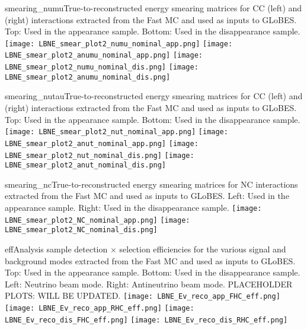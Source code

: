 \begin{cdrfigure}{smearing_numu}{True-to-reconstructed energy smearing matrices for CC \numu (left) and \anumu (right) interactions extracted from the Fast MC and used as inputs to GLoBES.  Top: Used in the appearance sample.  Bottom: Used in the disappearance sample.}
 \texttt{[image: LBNE\_smear\_plot2\_numu\_nominal\_app.png]}
 \texttt{[image: LBNE\_smear\_plot2\_anumu\_nominal\_app.png]}
 \texttt{[image: LBNE\_smear\_plot2\_numu\_nominal\_dis.png]}
 \texttt{[image: LBNE\_smear\_plot2\_anumu\_nominal\_dis.png]}
\end{cdrfigure}

\begin{cdrfigure}{smearing_nutau}{True-to-reconstructed energy smearing matrices for CC \nutau (left) and \anutau (right) interactions extracted from the Fast MC and used as inputs to GLoBES.  Top: Used in the appearance sample.  Bottom: Used in the disappearance sample.}
 \texttt{[image: LBNE\_smear\_plot2\_nut\_nominal\_app.png]}
 \texttt{[image: LBNE\_smear\_plot2\_anut\_nominal\_app.png]}
 \texttt{[image: LBNE\_smear\_plot2\_nut\_nominal\_dis.png]}
 \texttt{[image: LBNE\_smear\_plot2\_anut\_nominal\_dis.png]}
\end{cdrfigure}

\begin{cdrfigure}{smearing_nc}{True-to-reconstructed energy smearing matrices for NC interactions extracted from the Fast MC and used as inputs to GLoBES.  Left: Used in the appearance sample.  Right: Used in the disappearance sample.}
 \texttt{[image: LBNE\_smear\_plot2\_NC\_nominal\_app.png]}
 \texttt{[image: LBNE\_smear\_plot2\_NC\_nominal\_dis.png]}
\end{cdrfigure}

\begin{cdrfigure}{eff}{Analysis sample detection $\times$ selection efficiencies for the various signal and background modes extracted from the Fast MC and used as inputs to GLoBES.  Top: Used in the appearance sample. Bottom: Used in the disappearance sample.  Left: Neutrino beam mode.  Right: Antineutrino beam mode. PLACEHOLDER PLOTS: WILL BE UPDATED.}
 \texttt{[image: LBNE\_Ev\_reco\_app\_FHC\_eff.png]}
 \texttt{[image: LBNE\_Ev\_reco\_app\_RHC\_eff.png]}
 \texttt{[image: LBNE\_Ev\_reco\_dis\_FHC\_eff.png]}
 \texttt{[image: LBNE\_Ev\_reco\_dis\_RHC\_eff.png]}
\end{cdrfigure}

